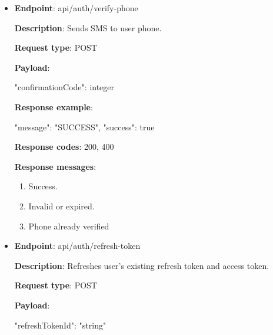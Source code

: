\begin{itemize}
    \textbf{Response codes}: 200, 400

    \textbf{Response messages}:
    \begin{enumerate}
        \item Success.
        \item Invalid credentials.
    \end{enumerate}

    \pagebreak

    \item \textbf{Endpoint}: api/auth/verify-phone

    \textbf{Description}: Sends SMS to user phone.

    \textbf{Request type}: POST

    \textbf{Payload}:

    \begin{spverbatim}
    {
        "confirmationCode": integer
    }
    \end{spverbatim}

    \textbf{Response example}:

    \begin{spverbatim}
    {
        "message": "SUCCESS",
        "success": true
    }
    \end{spverbatim}

    \textbf{Response codes}: 200, 400

    \textbf{Response messages}:
    \begin{enumerate}
        \item Success.
        \item Invalid or expired.
        \item Phone already verified
    \end{enumerate}

    \vspace{5mm}

    \item \textbf{Endpoint}: api/auth/refresh-token

    \textbf{Description}: Refreshes user's existing refresh token and access token.

    \textbf{Request type}: POST

    \textbf{Payload}:

    \begin{spverbatim}
    {
        "refreshTokenId": "string"
    }
    \end{spverbatim}


\end{itemize}
